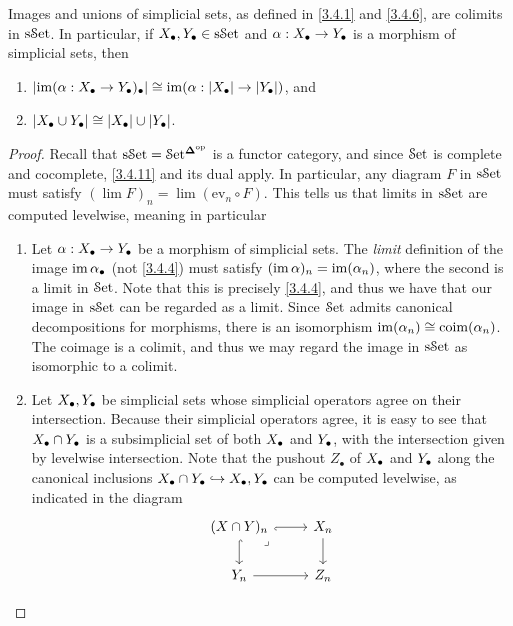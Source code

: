 \begin{corollary}\label{3.4.12}
    Images and unions of simplicial sets, as defined in \cref{3.4.1} and \cref{3.4.6}, are colimits in $\mathrm{s}\mathcal{S}\mathrm{et}$. In particular, if $X_\bullet,Y_\bullet\in\mathrm{s}\mathcal{S}\mathrm{et}$ and $\alpha : X_\bullet\to Y_\bullet$ is a morphism of simplicial sets, then
    \begin{enumerate}
        \item $\left|\operatorname{im}(\alpha : X_\bullet\to Y_\bullet)_\bullet\right|\cong\operatorname{im}(\alpha : |X_\bullet|\to|Y_\bullet|)$, and
        \item $\left|X_\bullet\cup Y_\bullet\right|\cong|X_\bullet|\cup|Y_\bullet|$.
    \end{enumerate}
\end{corollary}
\begin{proof}
    Recall that $\mathrm{s}\mathcal{S}\mathrm{et}=\mathcal{S}\mathrm{et}^{\boldsymbol{\Delta}^{\mathrm{op}}}$ is a functor category, and since $\mathcal{S}\mathrm{et}$ is complete and cocomplete, \cref{3.4.11} and its dual apply. In particular, any diagram $F$ in $\mathrm{s}\mathcal{S}\mathrm{et}$ must satisfy $(\lim F)_n=\lim (\mathrm{ev}_n\circ F)$. This tells us that limits in $\mathrm{s}\mathcal{S}\mathrm{et}$ are computed levelwise, meaning in particular
    \begin{enumerate}
        \item Let $\alpha : X_\bullet\to Y_\bullet$ be a morphism of simplicial sets. The \emph{limit} definition of the image $\operatorname{im}\alpha_\bullet$ (not \cref{3.4.4}) must satisfy $(\operatorname{im}\alpha)_n=\operatorname{im}(\alpha_n)$, where the second is a limit in $\mathcal{S}\mathrm{et}$. Note that this is precisely \cref{3.4.4}, and thus we have that our image in $\mathrm{s}\mathcal{S}\mathrm{et}$ can be regarded as a limit. Since $\mathcal{S}\mathrm{et}$ admits canonical decompositions for morphisms, there is an isomorphism $\operatorname{im}(\alpha_n)\cong\operatorname{coim}(\alpha_n)$. The coimage is a colimit, and thus we may regard the image in $\mathrm{s}\mathcal{S}\mathrm{et}$ as isomorphic to a colimit.
        \item Let $X_\bullet,Y_\bullet$ be simplicial sets whose simplicial operators agree on their intersection. Because their simplicial operators agree, it is easy to see that $X_\bullet\cap Y_\bullet$ is a subsimplicial set of both $X_\bullet$ and $Y_\bullet$, with the intersection given by levelwise intersection. Note that the pushout $Z_\bullet$ of $X_\bullet$ and $Y_\bullet$ along the canonical inclusions $X_\bullet\cap Y_\bullet\hookrightarrow X_\bullet,Y_\bullet$ can be computed levelwise, as indicated in the diagram
        \[\begin{tikzcd}
	{(X\cap Y)_n} & {X_n} \\
	{Y_n} & {Z_n}
	\arrow[hook', from=1-1, to=1-2]
	\arrow[hook, from=1-1, to=2-1]
	\arrow["\lrcorner"{anchor=center, pos=0.125}, draw=none, from=1-1, to=2-2]
	\arrow[from=1-2, to=2-2]
	\arrow[from=2-1, to=2-2]
    \end{tikzcd}\]

\end{enumerate}
\end{proof}
